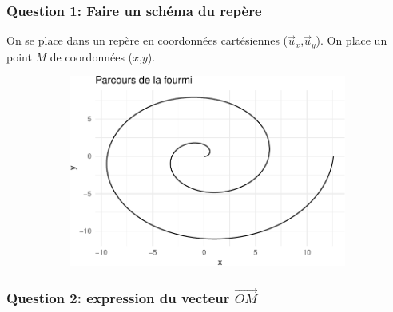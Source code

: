 \documentclass[
  12pt,
]{article}
\begin{document}
\hypertarget{question-1-faire-un-schuxe9ma-du-repuxe8re}{%
\subsubsection{Question 1: Faire un schéma du
repère}\label{question-1-faire-un-schuxe9ma-du-repuxe8re}}

On se place dans un repère en coordonnées cartésiennes
(\(\vec u_x\),\(\vec u_y\)). On place un point \(M\) de coordonnées
(\(x\),\(y\)).

\begin{figure}

\begin{minipage}[t]{0.50\linewidth}

{\centering 

\begin{figure}

{\centering \includegraphics{01-TD_files/figure-pdf/unnamed-chunk-1-1.pdf}

}

\end{figure}

}

\end{minipage}%
%
\begin{minipage}[t]{0.50\linewidth}

{\centering 

}

\end{minipage}%

\end{figure}

\hypertarget{question-2-expression-du-vecteur-vecom}{%
\subsubsection{\texorpdfstring{Question 2: expression du vecteur
\(\vec{OM}\)}{Question 2: expression du vecteur \textbackslash vec\{OM\}}}\label{question-2-expression-du-vecteur-vecom}}
\end{document}

